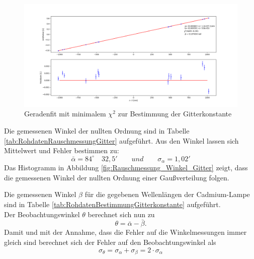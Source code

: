 \documentclass[12pt,a4paper]{article}
\begin{document}
\begin{figure}
\begin{center}
\includegraphics[scale=0.4]{Bilder/Anpassung_Gitterkonstante.png}
\end{center}
\caption[Fit Gitterkonstante]{Geradenfit mit minimalem $\chi ^2$ zur Bestimmung der Gitterkonstante}
\label{fig:Fit_Gitterkonstante}
\end{figure}

Die gemessenen Winkel der nullten Ordnung sind in Tabelle \ref{tab:RohdatenRauschmessungGitter} aufgeführt. Aus den Winkel lassen sich Mittelwert und Fehler bestimmen zu:
\begin{equation*}
\bar{\alpha} = 84^{\circ} \quad 32,5' \qquad und \qquad \sigma_{\alpha} = 1,02'
\end{equation*}
Das Histogramm in Abbildung \ref{fig:Rauschmessung_Winkel_Gitter} zeigt, dass die gemessenen Winkel der nullten Ordnung einer Gaußverteilung folgen.

Die gemessenen Winkel $\beta$ für die gegebenen Wellenlängen der Cadmium-Lampe sind in Tabelle \ref{tab:RohdatenBestimmungGitterkonstante} aufgeführt.\\
Der Beobachtungswinkel $\theta$ berechnet sich nun zu 
\begin{equation}
\theta = \bar{\alpha} - \bar{\beta}.
\end{equation}
Damit und mit der Annahme, dass die Fehler auf die Winkelmessungen immer gleich sind berechnet sich der Fehler auf den Beobachtungswinkel als
\begin{equation}
\sigma _{\theta} = \sigma _{\alpha} + \sigma _{\beta} = 2 \cdot \sigma _{\alpha}
\end{equation}
\end{document}
